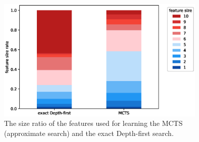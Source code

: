 \begin{figure}[htbp]
  \begin{center}
   \includegraphics[width=100mm]{img/feature_rate.eps}
  \end{center}
 \caption{The size ratio of the features used for learning the MCTS (approximate search) and the exact Depth-first search.}
  \label{fig:feature_rate}
\end{figure}

